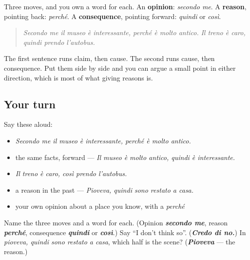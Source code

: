 \begin{grammarlens}[title={What you've built}]
Three moves, and you own a word for each. An \textbf{opinion}: \emph{secondo me}. A \textbf{reason}, pointing back: \emph{perché}. A \textbf{consequence}, pointing forward: \emph{quindi} or \emph{così}.

\begin{quote}
\emph{Secondo me il museo è interessante, perché è molto antico.} \emph{Il treno è caro, quindi prendo l'autobus.}
\end{quote}

The first sentence runs claim, then cause. The second runs cause, then consequence. Put them side by side and you can argue a small point in either direction, which is most of what giving reasons is.
\end{grammarlens}

\subsection*{Your turn}
Say these aloud:

\begin{itemize}
\raggedright
  \item \emph{Secondo me il museo è interessante, perché è molto antico.}
  \item the same facts, forward — \emph{Il museo è molto antico, quindi è interessante.}
  \item \emph{Il treno è caro, così prendo l'autobus.}
  \item a reason in the past — \emph{Pioveva, quindi sono restato a casa.}
  \item your own opinion about a place you know, with a \emph{perché}
\end{itemize}

\begin{tcolorbox}[breakable,colback=teal!4,colframe=teal!35!black,title={Before you move on}]
Name the three moves and a word for each. (Opinion \emph{\textbf{secondo me}}, reason \emph{\textbf{perché}}, consequence \emph{\textbf{quindi}} or \emph{\textbf{così}}.) Say \textquotedblleft{}I don't think so\textquotedblright{}. (\emph{\textbf{Credo di no.}}) In \emph{pioveva, quindi sono restato a casa}, which half is the scene? (\emph{\textbf{Pioveva}} — the reason.)
\end{tcolorbox}
